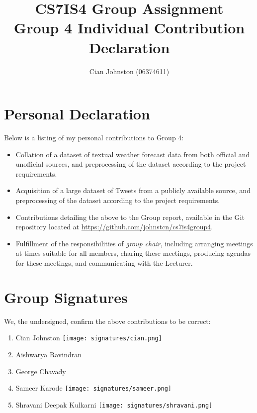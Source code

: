 \documentclass[a4paper,10pt]{article}
\begin{document}
\title{
    CS7IS4 Group Assignment \\
    \large Group 4 Individual Contribution Declaration
}
\author{
    Cian Johnston (06374611)
}

\maketitle

\section{Personal Declaration}

Below is a listing of my personal contributions to Group 4:

\begin{itemize}
    \item{
        Collation of a dataset of textual weather forecast data from both official and unofficial sources, and preprocessing of the dataset according to the project requirements.
    }
    \item{
        Acquisition of a large dataset of Tweets from a publicly available source, and preprocessing of the dataset according to the project requirements.
    }
    \item{
        Contributions detailing the above to the Group report, available in the Git repository located at \url{https://github.com/johnstcn/cs7is4group4}.
    }
    \item{
        Fulfillment of the responsibilities of \textit{group chair}, including arranging meetings at times suitable for all members, charing these meetings, producing agendas for these meetings, and communicating with the Lecturer. 
    }
\end{itemize}

\section{Group Signatures}

We, the undersigned, confirm the above contributions to be correct:

\begin{enumerate}
    \item{
        Cian Johnston \texttt{[image: signatures/cian.png]}
    }
    \item{
        Aishwarya Ravindran
    }
    \item{
        George Chavady
    }
    \item{
        Sameer Karode \texttt{[image: signatures/sameer.png]}
    }
    \item{
        Shravani Deepak Kulkarni \texttt{[image: signatures/shravani.png]}
    }

\end{enumerate}
\end{document}
